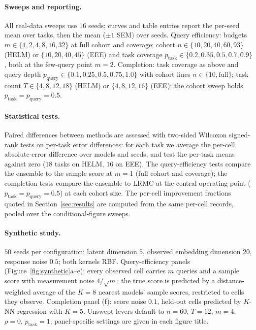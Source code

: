 \documentclass{article}
\theoremstyle{definition}
\theoremstyle{plain}
\begin{document}
\paragraph{Sweeps and reporting.}\begin{sloppypar} All real-data sweeps use $16$ seeds; curves and table
entries report the per-seed mean over tasks, then the mean ($\pm1$ SEM) over seeds. Query
efficiency: budgets $m\in\{1,2,4,8,16,32\}$ at full cohort and coverage; cohort
$n\in\{10,20,40,60,93\}$ (HELM) or $\{10,20,40,45\}$ (EEE) and task coverage
$p_{\mathrm{task}}\in\{0.2,0.35,0.5,0.7,0.9\}$, both at the few-query point $m{=}2$.
Completion: task coverage as above and query depth
$p_{\mathrm{query}}\in\{0.1,0.25,0.5,0.75,1.0\}$ with cohort lines $n\in\{10,\text{full}\}$;
task count $T\in\{4,8,12,18\}$ (HELM) or $\{4,8,12,16\}$ (EEE); the cohort sweep holds
$p_{\mathrm{task}}{=}p_{\mathrm{query}}{=}0.5$.\end{sloppypar}

\paragraph{Statistical tests.} Paired differences between methods are assessed with
two-sided Wilcoxon signed-rank tests  on per-task error differences: for each task we
average the per-cell absolute-error difference over models and seeds, and test the
per-task means against zero ($18$ tasks on HELM, $16$ on EEE).
The query-efficiency tests compare the ensemble to the sample score at $m{=}1$ (full
cohort and coverage); the completion tests compare the ensemble to LRMC at the
central operating point ($p_{\mathrm{task}}{=}p_{\mathrm{query}}{=}0.5$) at each
cohort size.
The per-cell improvement fractions quoted in Section~\ref{sec:results} are computed
from the same per-cell records, pooled over the conditional-figure sweeps.

\paragraph{Synthetic study.} $50$ seeds per configuration; latent dimension $5$, observed
embedding dimension $20$, response noise $0.5$; both kernels RBF.
Query-efficiency panels (Figure~\ref{fig:synthetic}a--e): every observed cell carries
$m$ queries and a sample score with measurement noise $4/\sqrt{m}$; the true
score is predicted by a distance-weighted average of the $K{=}8$ nearest models'
sample scores, restricted to cells they observe.
Completion panel (f): score noise $0.1$, held-out cells predicted by $K$-NN regression
with $K{=}5$.
Unswept levers default to $n{=}60$, $T{=}12$, $m{=}4$, $\rho{=}0$,
$p_{\mathrm{task}}{=}1$; panel-specific settings are given in each figure title.
\end{document}
